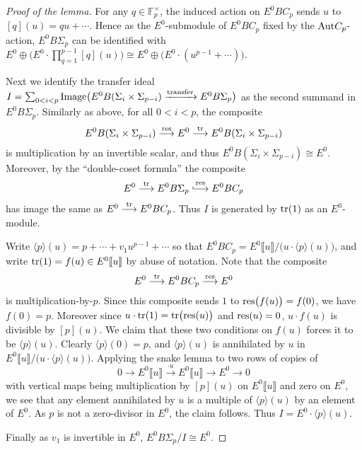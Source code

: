 \documentclass{gtpart}
\theoremstyle{definition}
\theoremstyle{remark}
\newcommand{\mb}[1]{\mathbb{#1}}
\newcommand*{\longhookrightarrow}{\ensuremath{\lhook\joinrel\relbar\joinrel\rightarrow}}
\begin{document}
\begin{proof}[Proof of the lemma]
For any $q \in {\mb F}_p^\times$, the induced action on $E^0 BC_p$ sends $u$ to 
$[q](u) = q u + \cdots$.  Hence as the $E^0$-submodule of $E^0 BC_p$ fixed by the ${\rm Aut} C_p$-action, $E^0 B\Sigma_p$ can be identified with 
$E^0 \oplus \big(E^0 \cdot \prod_{q=1}^{p-1} [q](u)\big) \cong E^0 \oplus \big(E^0 \cdot (u^{p-1} + \cdots)\big)$.  

Next we identify the transfer ideal $I = \sum_{0<i<p} 
{\rm Image}\big(E^0 B(\Sigma_i\times\Sigma_{p-i}) 
\xrightarrow{\text{transfer}} E^0 B\Sigma_{p}\big)$ as the second summand 
in $E^0 B\Sigma_p$.  Similarly as above, for all $0 < i < p$, the 
composite
\[
 E^0 B(\Sigma_i \times \Sigma_{p-i}) \stackrel{\rm res}{\longrightarrow} 
 E^0 \stackrel{\rm tr}{\longrightarrow} 
 E^0 B(\Sigma_i \times \Sigma_{p-i})
\]
is multiplication by an invertible scalar, and thus 
$E^0 B(\Sigma_i \times \Sigma_{p-i}) \cong E^0$.  Moreover, by the 
``double-coset formula'' the composite 
\[
 E^0 \stackrel{\rm tr}{\longrightarrow} E^0 B\Sigma_p 
 \stackrel{\rm res}{\longhookrightarrow} E^0 BC_p
\]
has image the same as $E^0 \stackrel{\rm tr}{\longrightarrow} E^0 BC_p$.  
Thus $I$ is generated by ${\rm tr}(1)$ as an $E^0$-module.  

Write $\langle p \rangle(u) = p + \cdots + v_1 u^{p-1} + \cdots$ so that $E^0 BC_p = E^0 \llbracket u \rrbracket / \big( u \cdot \langle p \rangle(u) \big)$, 
and write ${\rm tr}(1) = f(u) \in E^0 \llbracket u \rrbracket$ by abuse of 
notation.  Note that the composite 
\[
 E^0 \stackrel{\rm tr}{\longrightarrow} E^0 BC_p 
 \stackrel{\rm res}{\longrightarrow} E^0
\]
is multiplication-by-$p$.  Since this composite sends $1$ to ${\rm res}\big( f(u) \big) = f(0)$, we have $f(0) = p$.  
Moreover since $u \cdot {\rm tr}(1) = {\rm tr}\big( {\rm res}(u) \big)$ and ${\rm res}(u) = 0$, $u \cdot f(u)$ is divisible by $[p](u)$.  We claim that 
these two conditions on $f(u)$ forces it to be $\langle p \rangle (u)$.  Clearly $\langle p \rangle(0) = p$, and $\langle p \rangle(u)$ is annihilated by $u$ in $E^0 \llbracket u \rrbracket / \big( u \cdot 
\langle p \rangle(u) \big)$.  Applying the snake lemma to two rows of 
copies of
\[
 0 \longrightarrow E^0 \llbracket u \rrbracket 
 \stackrel{\cdot u}{\longrightarrow} E^0 \llbracket u \rrbracket 
 \longrightarrow E^0 \longrightarrow 0
\]
with vertical maps being multiplication by $[p](u)$ on 
$E^0 \llbracket u \rrbracket$ and zero on $E^0$, we see that any 
element annihilated by $u$ is a multiple of $\langle p \rangle(u)$ by an 
element of $E^0$.  As $p$ is not a zero-divisor in $E^0$, the claim 
follows.  Thus $I = E^0 \cdot \langle p \rangle(u)$.  

Finally as $v_1$ is invertible in $E^0$, $E^0 B\Sigma_p/I \cong E^0$.
\end{proof}
\end{document}
